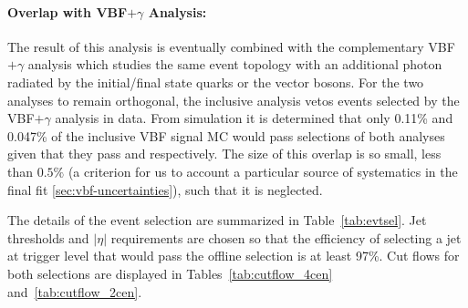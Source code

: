 
\paragraph{Overlap with VBF$+\gamma$ Analysis:} The result of this analysis is eventually combined with the complementary VBF$+\gamma$ analysis which studies the same event topology with an additional photon radiated by the initial/final state quarks or the vector bosons. For the two analyses to remain orthogonal, the inclusive analysis vetos events selected by the VBF$+\gamma$ analysis in data. From simulation it is determined that only 0.11\% and 0.047\% of the inclusive VBF signal MC would pass selections of both analyses given that they pass \twocentral and \fourcentral respectively. The size of this overlap is so small, less than $0.5\%$ (a criterion for us to account a particular source of systematics in the final fit \ref{sec:vbf-uncertainties}), such that it is neglected.  



The details of the event selection are summarized in Table~\ref{tab:evtsel}. 
Jet \pT thresholds and $|\eta|$ requirements are chosen so that the efficiency of selecting a jet at trigger level that would pass the offline selection is at least 97\%. Cut flows for both selections are displayed in Tables~\ref{tab:cutflow_4cen} and~\ref{tab:cutflow_2cen}.


